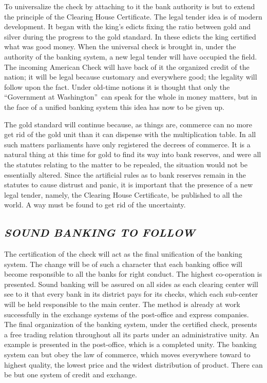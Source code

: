 \documentclass[twoside,symmetric,nobib,justified]{tufte-book}
\begin{document}
To universalize the check by attaching to it the bank authority is but
to extend the principle of the Clearing House Certificate. The legal
tender idea is of modern development. It began with the king's edicts
fixing the ratio between gold and silver during the progress to the gold
standard. In these edicts the king certified what was good money. When
the universal check is brought in, under the authority of the banking
system, a new legal tender will have occupied the field. The incoming
American Check will have back of it the organized credit of the nation;
it will be legal because customary and everywhere good; the legality
will follow upon the fact. Under old-time notions it is thought that
only the ``Government at Washington''~can speak for the whole in money
matters, but in the face of a unified banking system this idea has now
to be given up.

\enlargethispage{\baselineskip}

The gold standard will continue because, as things are, commerce can no
more get rid of the gold unit than it can dispense with the
multiplication table. In all such matters parliaments have only
registered the decrees of commerce. It is a natural thing at this time
for gold to find its way into bank reserves, and were all the statutes
relating to the matter to be repealed, the situation would not be
essentially altered. Since the artificial rules as to bank reserves
remain in the statutes to cause distrust and panic, it is important that
the presence of a new legal tender, namely, the Clearing House
Certificate, be published to all the world. A way must be found to get
rid of the uncertainty.~

\hypertarget{sound-banking-to-follow}{%
\subsection{\texorpdfstring{\emph{SOUND BANKING TO
FOLLOW}}{SOUND BANKING TO FOLLOW}}\label{sound-banking-to-follow}}

The certification of the check will act as the final unification of the
banking system. The change will be of such a character that each banking
office will become responsible to all the banks for right conduct. The
highest co-operation is presented. Sound banking will be assured on all
sides as each clearing center will see to it that every bank in its
district pays for its checks, which each sub-center will be held
responsible to the main center. The method is already at work
successfully in the exchange systems of the post-office and express
companies. The final organization of the banking system, under the
certified check, presents a free trading relation throughout all its
parts under an administrative unity. An example is presented in the
post-office, which is a completed unity. The banking system can but obey
the law of commerce, which moves everywhere toward to highest quality,
the lowest price and the widest distribution of product. There can be
but one system of credit and exchange. ~
\end{document}
